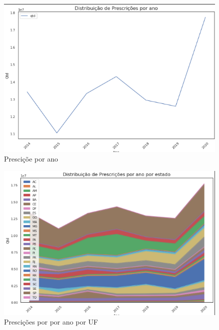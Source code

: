 \documentclass[10pt,brazil]{beamer}
\theoremstyle{definition}
\begin{document}

\begin{frame}[plain]
  \hspace*{-10mm}
    \begin{figure}
    \centering  
  \includegraphics[width=.6\paperwidth]{distribuicao_presc_ano.png}
      \caption{Presciçõe por ano}
  \end{figure}  
\end{frame}


\begin{frame}[plain]
  \hspace*{-10mm}
    \begin{figure}
    \centering  
  \includegraphics[width=.6\paperwidth]{distribuicao_presc_ano_estado.png}
      \caption{Prescições por por ano por UF}
  \end{figure}  
\end{frame}
\end{document}
